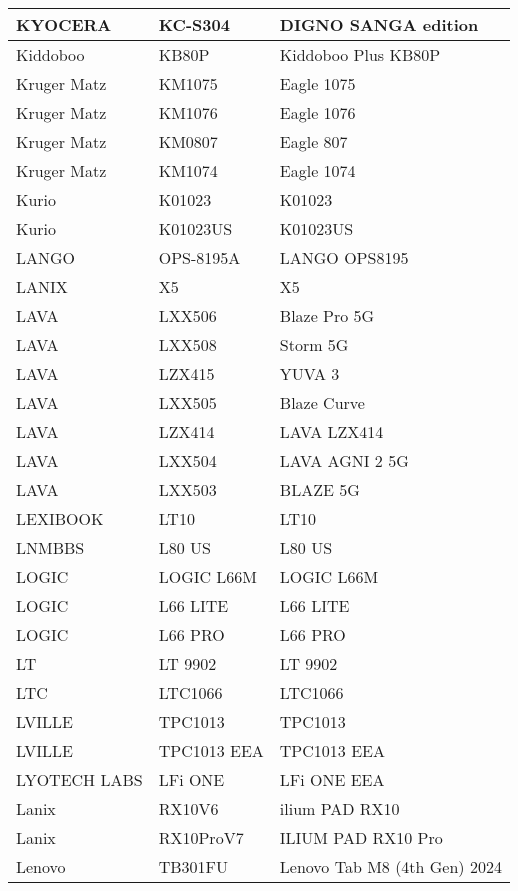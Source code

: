 \begin{tabularx}{\linewidth}{|l|X|X|}
        KYOCERA & KC-S304 & DIGNO SANGA edition \\ \hline
        Kiddoboo & KB80P & Kiddoboo Plus KB80P \\ \hline
        Kruger Matz & KM1075 & Eagle 1075 \\ \hline
        Kruger Matz & KM1076 & Eagle 1076 \\ \hline
        Kruger Matz & KM0807 & Eagle 807 \\ \hline
        Kruger Matz & KM1074 & Eagle 1074 \\ \hline
        Kurio & K01023 & K01023 \\ \hline
        Kurio & K01023US & K01023US \\ \hline
        LANGO & OPS-8195A & LANGO OPS8195 \\ \hline
        LANIX & X5 & X5 \\ \hline
        LAVA & LXX506 & Blaze Pro 5G \\ \hline
        LAVA & LXX508 & Storm 5G \\ \hline
        LAVA & LZX415 & YUVA 3 \\ \hline
        LAVA & LXX505 & Blaze Curve \\ \hline
        LAVA & LZX414 & LAVA LZX414 \\ \hline
        LAVA & LXX504 & LAVA AGNI 2 5G \\ \hline
        LAVA & LXX503 & BLAZE 5G \\ \hline
        LEXIBOOK & LT10 & LT10 \\ \hline
        LNMBBS & L80 US & L80 US \\ \hline
        LOGIC & LOGIC L66M & LOGIC L66M \\ \hline
        LOGIC & L66 LITE & L66 LITE \\ \hline
        LOGIC & L66 PRO & L66 PRO \\ \hline
        LT & LT 9902 & LT 9902 \\ \hline
        LTC & LTC1066 & LTC1066 \\ \hline
        LVILLE & TPC1013 & TPC1013 \\ \hline
        LVILLE & TPC1013 EEA & TPC1013 EEA \\ \hline
        LYOTECH LABS & LFi ONE & LFi ONE EEA \\ \hline
        Lanix & RX10V6 & ilium PAD RX10 \\ \hline
        Lanix & RX10ProV7 & ILIUM PAD RX10 Pro \\ \hline
        Lenovo & TB301FU & Lenovo Tab M8 (4th Gen) 2024 \\ \hline

\end{tabularx}
